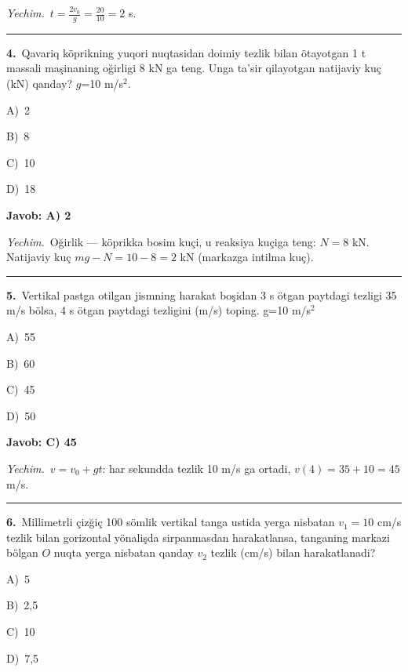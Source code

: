\documentclass[11pt,a4paper]{article}
\newcommand{\opt}[2]{\hspace*{4mm}#1)\ #2\par}
\begin{document}
\noindent\textit{Yechim.}\ $t=\frac{2v_0}{g}=\frac{20}{10}=2$ s.\par\par\medskip\hrule\medskip
{}\noindent\begin{minipage}{\linewidth}
\textbf{4.}\ Qavariq köprikning yuqori nuqtasidan doimiy tezlik bilan ötayotgan 1 t massali maşinaning oğirligi 8 kN ga teng. Unga ta’sir qilayotgan natijaviy kuç (kN) qanday? $g$=10 m/s$^{2}$.\par\smallskip
\opt{A}{2}
\opt{B}{8}
\opt{C}{10}
\opt{D}{18}
\end{minipage}\vspace{2pt}\par
\noindent\colorbox{gray!12}{\parbox{\dimexpr\linewidth-2\fboxsep}{\textbf{Javob: A) 2}}}\par\smallskip
\noindent\textit{Yechim.}\ Oğirlik — köprikka bosim kuçi, u reaksiya kuçiga teng: $N=8$ kN. Natijaviy kuç $mg-N=10-8=2$ kN (markazga intilma kuç).\par\par\medskip\hrule\medskip
{}\noindent\begin{minipage}{\linewidth}
\textbf{5.}\ Vertikal pastga otilgan jismning harakat boşidan 3 s ötgan paytdagi tezligi 35 m/s bölsa, 4 s ötgan paytdagi tezligini (m/s) toping. g=10 m/s$^{2}$\par\smallskip
\opt{A}{55}
\opt{B}{60}
\opt{C}{45}
\opt{D}{50}
\end{minipage}\vspace{2pt}\par
\noindent\colorbox{gray!12}{\parbox{\dimexpr\linewidth-2\fboxsep}{\textbf{Javob: C) 45}}}\par\smallskip
\noindent\textit{Yechim.}\ $v=v_0+gt$: har sekundda tezlik 10 m/s ga ortadi, $v(4)=35+10=45$ m/s.\par\par\medskip\hrule\medskip
{}\noindent\begin{minipage}{\linewidth}
\textbf{6.}\ Millimetrli çizğiç 100 sömlik vertikal tanga ustida yerga nisbatan $v_1=10$ cm/s tezlik bilan gorizontal yönalişda sirpanmasdan harakatlansa, tanganing markazi bölgan $O$ nuqta yerga nisbatan qanday $v_2$ tezlik (cm/s) bilan harakatlanadi?\par\smallskip
\noindent\hspace*{4mm}\par\smallskip
\opt{A}{5}
\opt{B}{2,5}
\opt{C}{10}
\opt{D}{7,5}
\end{minipage}\vspace{2pt}\par
\end{document}
